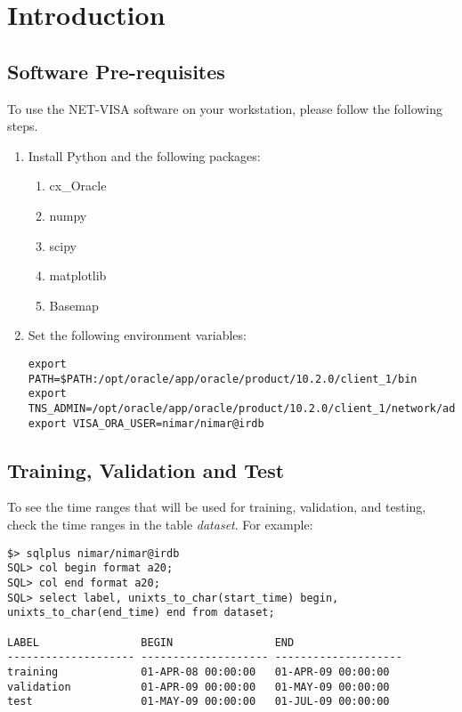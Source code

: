 

\chapter{Introduction}


\section{Software Pre-requisites}
To use the NET-VISA software on your workstation, please follow the
following steps.

\begin{enumerate}
\item Install Python and the following packages:
\begin{enumerate}
\item cx\_Oracle
\item numpy
\item scipy
\item matplotlib
\item Basemap
\end{enumerate}
\item Set the following environment variables:
{\footnotesize
\begin{verbatim}
export PATH=$PATH:/opt/oracle/app/oracle/product/10.2.0/client_1/bin
export TNS_ADMIN=/opt/oracle/app/oracle/product/10.2.0/client_1/network/admin
export VISA_ORA_USER=nimar/nimar@irdb
\end{verbatim}
}
\end{enumerate}

\section{Training, Validation and Test}

To see the time ranges that will be used for training, validation, and
testing, check the time ranges in the table {\em dataset}. For example:
\begin{verbatim}
$> sqlplus nimar/nimar@irdb
SQL> col begin format a20;
SQL> col end format a20;
SQL> select label, unixts_to_char(start_time) begin,
unixts_to_char(end_time) end from dataset;

LABEL                BEGIN                END
-------------------- -------------------- --------------------
training             01-APR-08 00:00:00   01-APR-09 00:00:00
validation           01-APR-09 00:00:00   01-MAY-09 00:00:00
test                 01-MAY-09 00:00:00   01-JUL-09 00:00:00

\end{verbatim}


